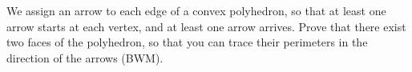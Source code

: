 We assign an arrow to each edge of a convex polyhedron, so that at least one arrow starts at each vertex, and at least one arrow arrives. Prove that there exist two faces of the polyhedron, so that you can trace their perimeters in the direction of the arrows (BWM).
